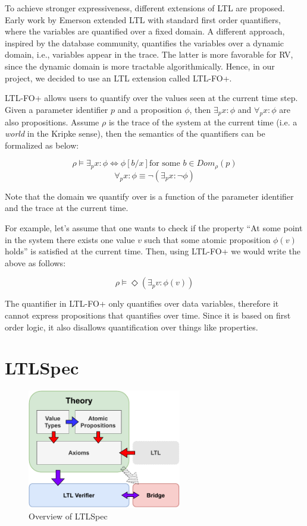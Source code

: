 \documentclass[format=acmsmall, nonacm=true, review=true, screen=true]{acmart}
\newcommand{\mycaption}[1]{\Description{#1}\caption{#1}}
\begin{document}
To achieve stronger expressiveness, different extensions of LTL are proposed. Early work by Emerson \cite{emerson1990temporal} extended LTL with standard first order quantifiers, where the variables are quantified over a fixed domain. A different approach, inspired by the database community, quantifies the variables over a dynamic domain, i.e., variables appear in the trace. The latter is more favorable for RV, since the dynamic domain is more tractable algorithmically. Hence, in our project, we decided to use an LTL extension called LTL-FO+.

LTL-FO+ allows users to quantify over the values seen at the current time step. Given a parameter identifier $p$ and a proposition $\phi$, then $\exists_{p} x : \phi$ and $\forall_{p} x:\phi$ are also propositions. Assume $\rho$ is the trace of the system at the current time (i.e. a \textit{world} in the Kripke sense), then the semantics of the quantifiers can be formalized as below:

$$\rho\vDash \exists_p x:\phi \Leftrightarrow \phi[b/x] \text{for some }b\in Dom_{\rho}(p)$$
$$\forall_{p} x : \phi \equiv \lnot(\exists_{p}x: \lnot\phi)$$

Note that the domain we quantify over is a function of the parameter identifier and the trace at the current time.

For example, let's assume that one wants to check if the property “At some point in the system there exists one value $v$ such that some atomic proposition $\phi(v)$ holds” is satisfied at the current time. Then, using LTL-FO+ we would write the above as follows:

$$ \rho \vDash \Diamond(\exists_{p} v :\phi(v)) $$

The quantifier in LTL-FO+ only quantifies over data variables, therefore it cannot express propositions that quantifies over time. Since it is based on first order logic, it also disallows quantification over things like properties.

\section{LTLSpec}

\begin{figure}[h]
  \includegraphics[width=0.6\textwidth]{images/ltlspec-overview.pdf}
  \centering
  \mycaption{Overview of LTLSpec}
  \label{fig:overview}
\end{figure}
\end{document}
